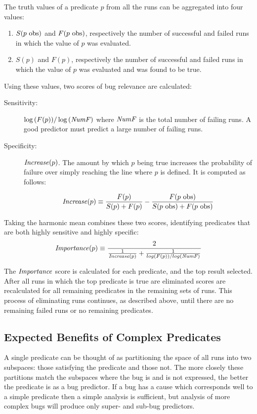 The truth values of a predicate $p$ from all the runs can be aggregated into four values:

\begin{enumerate}
\item $S(\text{$p$ obs})$ and $F(\text{$p$ obs})$, respectively the number of successful and failed runs in which the value of $p$ was evaluated.
\item $S(p)$ and $F(p)$, respectively the number of successful and failed runs in which the value of $p$ was evaluated and was found to be true.
\end{enumerate}

Using these values, two scores of bug relevance are calculated:
\begin{description}
\item[Sensitivity:] $\log{(F(p))} / \log{(\mathit{NumF})}$ where $\mathit{NumF}$ is the total number of failing runs.  A good predictor must predict a large number of failing runs.
\item[Specificity:] $\mathit{Increase}(p)$.  The amount by which $p$ being true increases the probability of failure over simply reaching the line where $p$ is defined.  It is computed as follows:

  \begin{equation*}
    \label{eqn1}
    \mathit{Increase}(p) \equiv
    \frac{F(p)}{S(p) + F(p)}
    -
    \frac{F(\text{$p$ obs})}{S(\text{$p$ obs}) + F(\text{$p$ obs})}
  \end{equation*}

\end{description}

Taking the harmonic mean combines these two scores, identifying predicates that are both highly sensitive and highly specific:
\begin{equation*}
\label{eqn2}
\Importance(p) \equiv
\frac{2}{%
  \frac{1}{\Increase(p)}
  +
  \frac{1}{log(F(p)) / log(\NumF)}}
\end{equation*}

The $\mathit{Importance}$ score is calculated for each predicate, and the top result selected.  After all runs in which the top predicate is true are eliminated scores are recalculated for all remaining predicates in the remaining sets of runs.  This process of eliminating runs continues, as described above, until there are no remaining failed runs or no remaining predicates.

\subsection{Expected Benefits of Complex Predicates}
A single predicate can be thought of as partitioning the space of all runs into two subspaces: those satisfying the predicate and those not.  The more closely these partitions match the subspaces where the bug is and is not expressed, the better the predicate is as a bug predictor.  If a bug has a cause which corresponds well to a simple predicate then a simple analysis is sufficient, but analysis of more complex bugs will produce only super- and sub-bug predictors.

